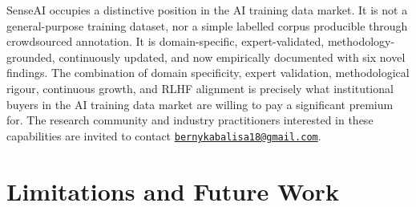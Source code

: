 \documentclass[11pt,a4paper]{article}
\begin{document}
SenseAI occupies a distinctive position in the AI training data market. It is not a
general-purpose training dataset, nor a simple labelled corpus producible through
crowdsourced annotation. It is domain-specific, expert-validated,
methodology-grounded, continuously updated, and now empirically documented with
six novel findings. The combination of domain specificity, expert validation,
methodological rigour, continuous growth, and RLHF alignment is precisely what
institutional buyers in the AI training data market are willing to pay a significant
premium for. The research community and industry practitioners interested in these
capabilities are invited to contact
\href{mailto:bernykabalisa18@gmail.com}{\texttt{bernykabalisa18@gmail.com}}.

\section{Limitations and Future Work}
\label{sec:limitations}
\end{document}
